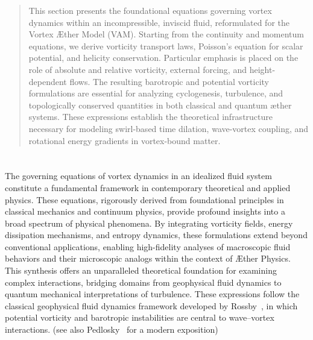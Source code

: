 \documentclass[12pt]{article}
\begin{document}
    \titlepageOpen

    \begin{abstract}
        This section presents the foundational equations governing vortex dynamics within an incompressible, inviscid fluid, reformulated for the Vortex Æther Model (VAM). Starting from the continuity and momentum equations, we derive vorticity transport laws, Poisson’s equation for scalar potential, and helicity conservation. Particular emphasis is placed on the role of absolute and relative vorticity, external forcing, and height-dependent flows. The resulting barotropic and potential vorticity formulations are essential for analyzing cyclogenesis, turbulence, and topologically conserved quantities in both classical and quantum æther systems. These expressions establish the theoretical infrastructure necessary for modeling swirl-based time dilation, wave-vortex coupling, and rotational energy gradients in vortex-bound matter.
    \end{abstract}

    \titlepageClose
    \fi

    \section{\papertitle}

    The governing equations of vortex dynamics in an idealized fluid system constitute a fundamental framework in contemporary theoretical and
    applied physics. These equations, rigorously derived from foundational principles in classical mechanics and continuum physics, provide
    profound insights into a broad spectrum of physical phenomena. By integrating vorticity fields, energy dissipation mechanisms, and entropy dynamics, these formulations extend beyond conventional applications, enabling high-fidelity analyses of macroscopic fluid behaviors and their microscopic analogs within the context of Æther Physics. This synthesis offers an unparalleled theoretical foundation for examining complex interactions, bridging domains from geophysical fluid dynamics to quantum mechanical interpretations of turbulence. These expressions follow the classical geophysical fluid dynamics framework developed by Rossby~\cite{rossby1939}, in which potential vorticity and barotropic instabilities are central to wave–vortex interactions. (see also Pedlosky~\cite{pedlosky1987} for a modern exposition)
\end{document}
